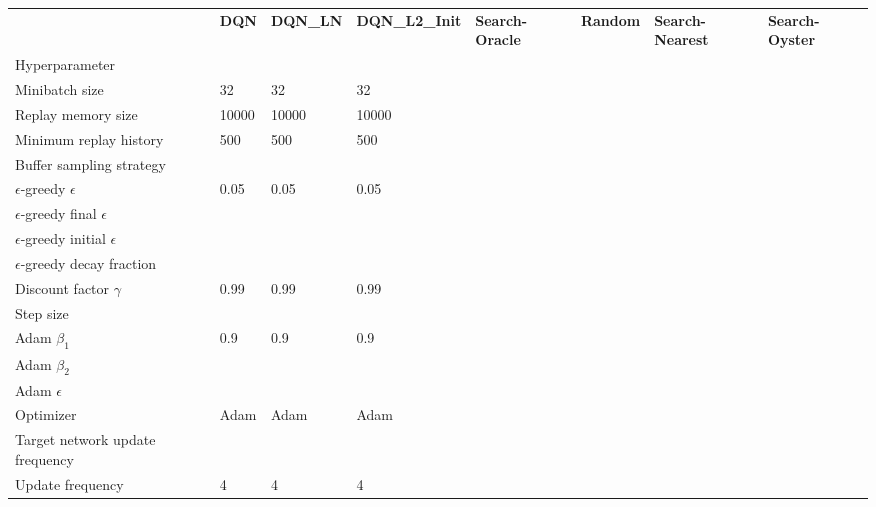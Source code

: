 \begin{tabular}{llllllll}
 & \bfseries DQN & \bfseries DQN_LN & \bfseries DQN_L2_Init & \bfseries Search-Oracle & \bfseries Random & \bfseries Search-Nearest & \bfseries Search-Oyster \\
Hyperparameter &  &  &  &  &  &  &  \\
Minibatch size & 32 & 32 & 32 &  &  &  &  \\
Replay memory size & 10000 & 10000 & 10000 &  &  &  &  \\
Minimum replay history & 500 & 500 & 500 &  &  &  &  \\
Buffer sampling strategy &  &  &  &  &  &  &  \\
$\epsilon$-greedy $\epsilon$ & 0.05 & 0.05 & 0.05 &  &  &  &  \\
$\epsilon$-greedy final $\epsilon$ &  &  &  &  &  &  &  \\
$\epsilon$-greedy initial $\epsilon$ &  &  &  &  &  &  &  \\
$\epsilon$-greedy decay fraction &  &  &  &  &  &  &  \\
Discount factor $\gamma$ & 0.99 & 0.99 & 0.99 &  &  &  &  \\
Step size &  &  &  &  &  &  &  \\
Adam $\beta_1$ & 0.9 & 0.9 & 0.9 &  &  &  &  \\
Adam $\beta_2$ &  &  &  &  &  &  &  \\
Adam $\epsilon$ &  &  &  &  &  &  &  \\
Optimizer & Adam & Adam & Adam &  &  &  &  \\
Target network update frequency &  &  &  &  &  &  &  \\
Update frequency & 4 & 4 & 4 &  &  &  &  \\
\end{tabular}
